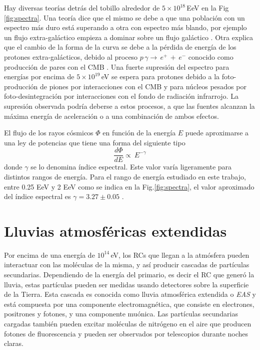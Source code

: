 Hay diversas teorías detrás del tobillo alrededor de $5 \times 10^{18}\,$EeV en la Fig\,\ref{fig:spectra}. Una teoría dice que el mismo se debe a que una población con un espectro más duro está superando a otra con espectro más blando, por ejemplo un flujo extra-galáctico empieza a dominar sobre un flujo galáctico \cite{bird1994cosmic}. Otra explica que el cambio de la forma de la curva se debe a la pérdida de energía de los protones extra-galácticos, debido al proceso $p\,\gamma \rightarrow\,e^+\,+\,e^-$ conocido como producción de pares con el CMB \cite{berezinsky2006astrophysical}. Una fuerte supresión del espectro para energías por encima de $5\times 10^{19}\,$eV se espera para protones debido a la foto-producción de piones por interacciones con el CMB y para núcleos pesados por foto-desintegración por interacciones con el fondo de radiación infrarrojo. La supresión observada podría deberse a estos procesos, a que las fuentes alcanzan la máxima energía de aceleración o a una combinación de ambos efectos. 

El flujo de los rayos cósmicos $\Phi$ en función de la energía $E$ puede aproximarse a una ley de potencias que tiene una forma del siguiente tipo
\begin{equation}
	    \frac{d\Phi}{dE} \propto \ E^{-\gamma}   \label{eq:expresion1}
\end{equation}
donde $\gamma$ se lo denomina índice espectral. Este valor varía ligeramente para distintos rangos de energía. Para el rango de energía estudiado en este trabajo, entre 0.25 EeV y 2 EeV como se indica en la Fig.\ref{fig:spectra}, el valor aproximado del índice espectral es $\gamma= 3.27 \pm 0.05$ \cite{data}.


\section{Lluvias atmosféricas extendidas}


{Por encima de una energía de $10^{14}\,$eV, los RCs que llegan a la atmósfera pueden interactuar con las moléculas de la misma,  y así producir cascadas de partículas secundarias. Dependiendo de la energía del primario, es decir el RC que generó la lluvia, estas partículas pueden ser medidas usando detectores sobre la superficie de la Tierra. Esta cascada es conocida como lluvia atmosférica extendida o \emph{EAS} y está compuesta por una componente electromagnética, que consiste en electrones, positrones y fotones, y una componente muónica. Las partículas secundarias cargadas también pueden excitar moléculas de nitrógeno en el aire que producen fotones de fluorescencia y pueden ser observados por telescopios durante noches claras.}

